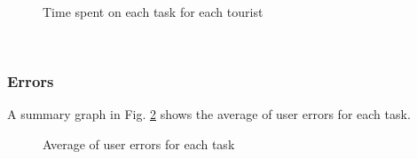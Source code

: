     \begin{figure}[!ht]
        \begin{minipage}{\linewidth}
            \centering
            \captionsetup{justification=centering}
            \caption{Time spent on each task for each tourist}
            \label{ResultsEfficiencyTourist}
        \end{minipage}
    \end{figure}
    \pagebreak
\pagebreak
\\
\subsubsection{Errors}
    A summary graph in Fig. \ref{BarsErrors} shows the average of user errors for each task.
    \begin{figure}[!ht]
        \begin{minipage}{\linewidth}
            \centering
            \captionsetup{justification=centering}
            \caption{Average of user errors for each task}
            \label{BarsErrors}
        \end{minipage}
    \end{figure}

